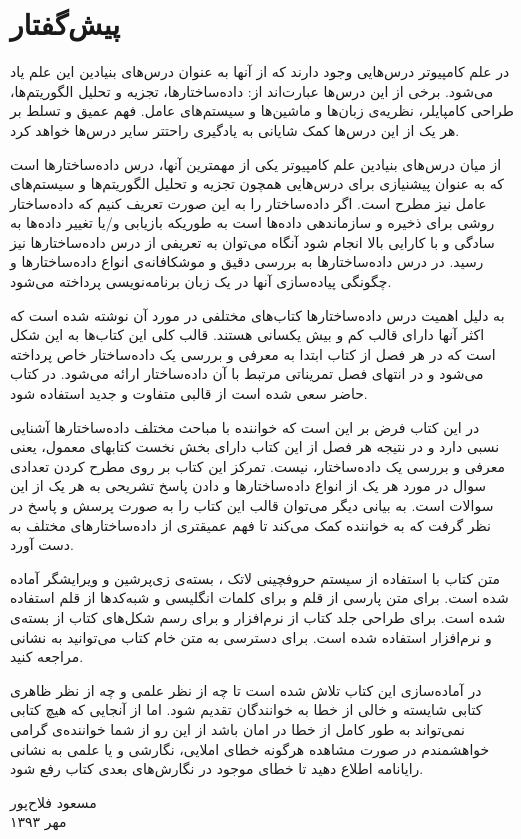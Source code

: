 \section*{پیش‌گفتار}
در علم کامپیوتر درس‌هایی وجود دارند که از آنها به عنوان درس‌های بنیادین این علم یاد می‌شود. برخی از این درس‌ها عبارت‌اند از: داده‌ساختارها، تجزیه و تحلیل الگوریتم‌ها، طراحی کامپایلر، نظریه‌ی زبان‌ها و ماشین‌ها و سیستم‌های عامل. فهم عمیق و تسلط بر هر یک از این درس‌ها کمک شایانی به یادگیری راحتتر سایر درس‌ها خواهد کرد.

از میان درس‌های بنیادین علم کامپیوتر یکی از مهمترین آنها، درس داده‌ساختارها است که به عنوان پیشنیازی برای درس‌هایی همچون تجزیه و تحلیل الگوریتم‌ها و سیستم‌های عامل نیز مطرح است. اگر داده‌ساختار را به این صورت تعریف کنیم که {\prq}داده‌ساختار روشی برای ذخیره و سازماندهی داده‌ها است به طوریکه بازیابی و/یا تغییر داده‌ها به سادگی و با کارایی بالا انجام شود{\plq} آنگاه می‌توان به تعریفی از درس داده‌ساختارها نیز رسید. در درس داده‌ساختارها به بررسی دقیق و موشکافانه‌ی انواع داده‌ساختارها و چگونگی پیاده‌سازی آنها در یک زبان برنامه‌نویسی پرداخته می‌شود.

به دلیل اهمیت درس داده‌ساختارها کتاب‌های مختلفی در مورد آن نوشته شده است که اکثر آنها دارای قالب کم و بیش یکسانی هستند. قالب کلی این کتاب‌ها به این شکل است که در هر فصل از کتاب ابتدا به معرفی و بررسی یک داده‌ساختار خاص پرداخته می‌شود و در انتهای فصل تمریناتی مرتبط با آن داده‌ساختار ارائه می‌شود. در کتاب حاضر سعی شده است از قالبی متفاوت و جدید استفاده شود.

در این کتاب فرض بر این است که خواننده با مباحث مختلف داده‌ساختارها آشنایی نسبی دارد و در نتیجه هر فصل از این کتاب دارای بخش نخست کتابهای معمول، یعنی معرفی و بررسی یک داده‌ساختار، نیست. تمرکز این کتاب بر روی مطرح کردن تعدادی سوال در مورد هر یک از انواع داده‌ساختارها و دادن پاسخ تشریحی به هر یک از این سوالات است. به بیانی دیگر می‌توان قالب این کتاب را به صورت پرسش و پاسخ در نظر گرفت که به خواننده کمک می‌کند تا فهم عمیقتری از داده‌ساختارهای مختلف به دست آورد.

متن کتاب با استفاده از سیستم حروفچینی لاتک ، بسته‌ی زی‌پرشین و ویرایشگر {} آماده شده است. برای متن پارسی از قلم {} و برای کلمات انگلیسی و شبه‌کدها از قلم {} استفاده شده است. برای طراحی جلد کتاب از نرم‌افزار {} و برای رسم شکل‌های کتاب از بسته‌ی {} و نرم‌افزار {} استفاده شده است. برای دسترسی به متن خام کتاب می‌توانید به نشانی {} مراجعه کنید.

در آماده‌سازی این کتاب تلاش شده است تا چه از نظر علمی و چه از نظر ظاهری کتابی شایسته و خالی از خطا به خوانندگان تقدیم شود. اما از آنجایی که هیچ کتابی نمی‌تواند به طور کامل از خطا در امان باشد از این رو از شما خواننده‌ی گرامی خواهشمندم در صورت مشاهده هرگونه خطای املایی، نگارشی و یا علمی به نشانی رایانامه
{} اطلاع دهید تا خطای موجود در نگارش‌های بعدی کتاب رفع شود.

\begin{flushleft}
\small
مسعود فلاح‌پور\\
مهر ۱۳۹۳
\end{flushleft}